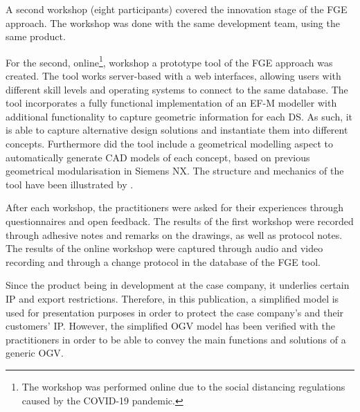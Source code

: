 \documentclass[preprints,article,accept,moreauthors,pdftex]{Definitions/mdpi}
\newcommand{\Jakob}[1]{{{\color{orange}{\itshape{#1}}\color{black}}
    }{\ignorespaces}}
\begin{document}
A second workshop (eight participants) covered the innovation stage of the \ac{FGE} approach. 
The workshop was done with the same development team, using the same product.%

For the second, online\footnote{The workshop was performed online due to the social distancing regulations caused by the COVID-19 pandemic.}, workshop a prototype tool of the \ac{FGE} approach was created.
The tool works server-based with a web interfaces, allowing users with different skill levels and operating systems to connect to the same database.
The tool incorporates a fully functional implementation of an \ac{EF-M} modeller with additional functionality to capture geometric information for each \ac{DS}.
As such, it is able to capture alternative design solutions and instantiate them into different concepts.
Furthermore did the tool include a geometrical modelling aspect to automatically generate \ac{CAD} models of each concept, based on previous geometrical modularisation in Siemens NX.
The structure and mechanics of the tool have been illustrated by \cite{Muller2020a}.

After each workshop, the practitioners were asked for their experiences through questionnaires and open feedback.
The results of the first workshop were recorded through adhesive notes and remarks on the drawings, as well as protocol notes.
The results of the online workshop were captured through audio and video recording and through a change protocol in the database of the \ac{FGE} tool.


Since the product being in development at the case company, it underlies certain \ac{IP} and export restrictions. 
Therefore, in this publication, a simplified model is used for presentation purposes in order to protect the case company's and their customers' \ac{IP}.
However, the simplified \ac{OGV} model has been verified with the practitioners in order to be able to convey the main functions and solutions of a generic \ac{OGV}.



\end{document}

